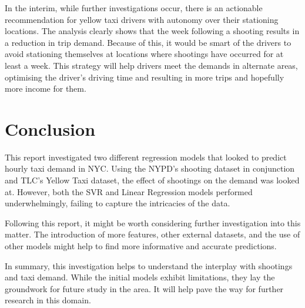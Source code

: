 \documentclass[11pt]{article}
\begin{document}
In the interim, while further investigations occur, there is an actionable recommendation for yellow taxi drivers with autonomy over their stationing locations. The analysis clearly shows that the week following a shooting results in a reduction in trip demand. Because of this, it would be smart of the drivers to avoid stationing themselves at locations where shootings have occurred for at least a week. This strategy will help drivers meet the demands in alternate areas, optimising the driver’s driving time and resulting in more trips and hopefully more income for them. 

\section{Conclusion}
\hspace{0pt}This report investigated two different regression models that looked to predict hourly taxi demand in NYC. Using the NYPD’s shooting dataset in conjunction and TLC’s Yellow Taxi dataset, the effect of shootings on the demand was looked at. However, both the SVR and Linear Regression models performed underwhelmingly, failing to capture the intricacies of the data. 

Following this report, it might be worth considering further investigation into this matter. The introduction of more features, other external datasets, and the use of other models might help to find more informative and accurate  predictions.

In summary, this investigation helps to understand the interplay with shootings and taxi demand. While the initial models exhibit limitations, they lay the groundwork for future study in the area. It will help pave the way for further research in this domain.

\clearpage
\end{document}
